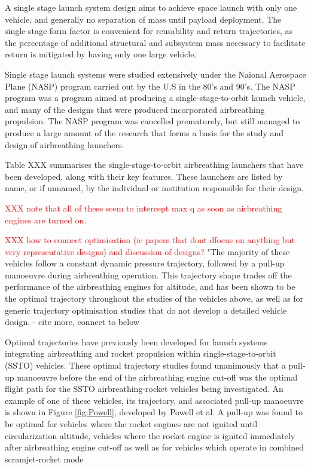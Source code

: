 A single stage launch system design aims to achieve space launch with only one vehicle, and generally no separation of mass until payload deployment. 
The single-stage form factor is convenient for reusability and return trajectories, as the percentage of additional structural and subsystem mass necessary to facilitate return is mitigated by having only one large vehicle. 

Single stage launch systems were studied extensively under the Naional Aerospace Plane (NASP) program carried out by the U.S in the 80's and 90's. The NASP program was a program aimed at producing a single-stage-to-orbit launch vehicle, and many of the designs that were produced incorporated airbreathing propulsion. The NASP program was cancelled prematurely, but still managed to produce a large amount of the research that forms a basis for the study and design of airbreathing launchers.

Table XXX summarises the single-stage-to-orbit airbreathing launchers that have been developed, along with their key features. These launchers are listed by name, or if unnamed, by the individual or institution responsible for their design. 

\textcolor{red}{XXX note that all of these seem to intercept max q as soon as airbreathing engines are turned on.}

\textcolor{red}{XXX how to connect optimisation (ie papers that dont dfocus on anything but very representative designs) and discussion of designs?}
"The majority of these vehicles follow a constant dynamic pressure trajectory, followed by a pull-up manoeuvre during airbreathing operation. This trajectory shape trades off the performance of the airbreathing engines for altitude, and has been shown to be the optimal trajectory throughout the studies of the vehicles above, as well as for generic trajectory optimisation studies that do not develop a detailed vehicle design\cite{Pescetelli2012,Mooij}. - cite more, connect to below




Optimal trajectories have previously been developed for launch systems integrating airbreathing and rocket propulsion within single-stage-to-orbit (SSTO) vehicles\cite{Powell1991,Lu1993,Trefny1999,Roche2000,Pescetelli2012,Young2006,Bradford2000}. These optimal trajectory studies found unanimously that a pull-up manoeuvre before the end of the airbreathing engine cut-off was the optimal flight path for the SSTO airbreathing-rocket vehicles being investigated. An example of one of these vehicles, its trajectory, and associated pull-up manoeuvre is shown in Figure \ref{fig:Powell}, developed by Powell et al\cite{Powell1991}. A pull-up was found to be optimal for vehicles where the rocket engines are not ignited until circularization altitude\cite{Powell1991,Lu1993}, vehicles where the rocket engine is ignited immediately after airbreathing engine cut-off\cite{Trefny1999,Roche2000,Pescetelli2012} as well as for vehicles which operate in combined scramjet-rocket mode\cite{Young2006,Bradford2000}




